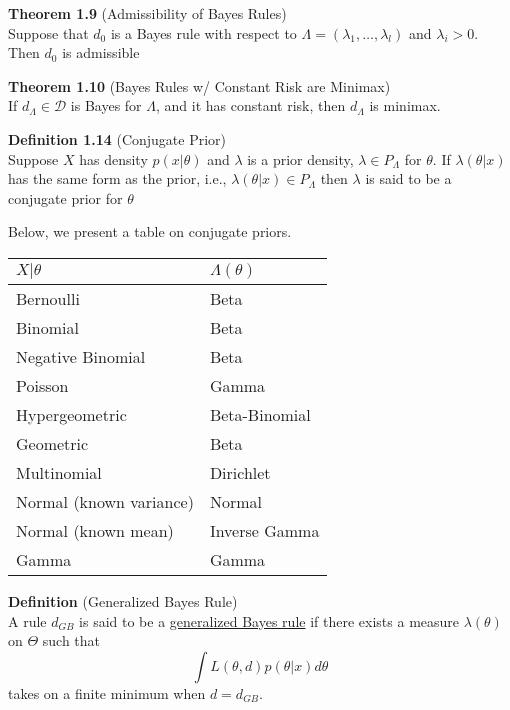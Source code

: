 \documentclass[12pt]{article}
\numberwithin{equation}{section}
\begin{document}
\textbf{Theorem 1.9} (Admissibility of Bayes Rules) \\
Suppose that $d_0$ is a Bayes rule with respect to 
$\Lambda = (\lambda_1, \ldots, \lambda_l)$ and $\lambda_i > 0$. Then $d_0$ is admissible

\textbf{Theorem 1.10} (Bayes Rules w/ Constant Risk are Minimax) \\
If $d_{\Lambda} \in \mathcal{D}$ is Bayes for $\Lambda$, and it has constant risk, then $d_{\Lambda}$ is minimax. 

\textbf{Definition 1.14} (Conjugate Prior) \\
Suppose $X$ has density $p(x | \theta)$ and $\lambda$ is a prior density, $\lambda \in P_{\Lambda}$ for $\theta$. If $\lambda(\theta | x)$ has the same form as the prior, i.e., $\lambda(\theta | x) \in P_{\Lambda}$ then $\lambda$ is said to be a conjugate prior for $\theta$ 

Below, we present a table on conjugate priors.
\begin{table}[H]
\centering
\begin{tabular}{ll}
$X | \theta$            & $\Lambda(\theta)$  \\ 
\hline
Bernoulli               & Beta           \\
Binomial                & Beta           \\
Negative Binomial       & Beta           \\
Poisson                 & Gamma          \\
Hypergeometric          & Beta-Binomial  \\
Geometric               & Beta           \\
Multinomial             & Dirichlet      \\
Normal (known variance) & Normal         \\
Normal (known mean)     & Inverse Gamma  \\
Gamma                   & Gamma          \\
\hline
\end{tabular}
\end{table}


\textbf{Definition} (Generalized Bayes Rule) \\
A rule $d_{GB}$ is said to be a \underline{generalized Bayes rule} if there exists a measure $\lambda(\theta)$ on $\Theta$ such that
\begin{equation*}
  \int L(\theta, d) p(\theta | x) d\theta
\end{equation*}
takes on a finite minimum when $d = d_{GB}$.
\end{document}
